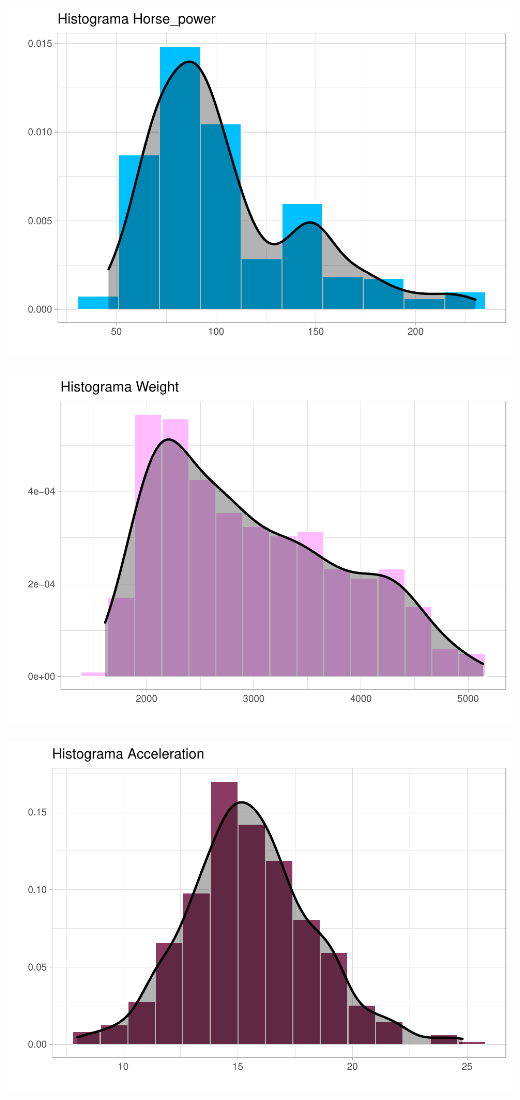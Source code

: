 \documentclass[
]{article}
\begin{document}
\begin{center}\includegraphics{EDA_files/figure-latex/unnamed-chunk-7-2} \end{center}

\begin{center}\includegraphics{EDA_files/figure-latex/unnamed-chunk-7-3} \end{center}

\begin{center}\includegraphics{EDA_files/figure-latex/unnamed-chunk-7-4} \end{center}
\end{document}
